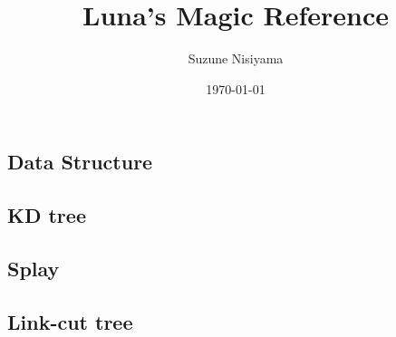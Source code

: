 \documentclass[titlepage, a4paper,10pt]{article}
\title{\LARGE{Luna's Magic Reference}}
\author{Suzune Nisiyama}
\date{\today}
\begin{document}
	\maketitle
	\begin{multicols}{2}
		\setcounter{tocdepth}{2}
		\begingroup
		\let\cleardoublepage\relax
		\let\clearpage\relax
		\tableofcontents
		\newpage
		\begin{spacing}{0.6}
		\section{Data Structure}
			\subsection{KD tree}
				
			\subsection{Splay}
				
			\subsection{Link-cut tree}
				
		\end{spacing}
		\endgroup
	\end{multicols}
	
\end{document}
